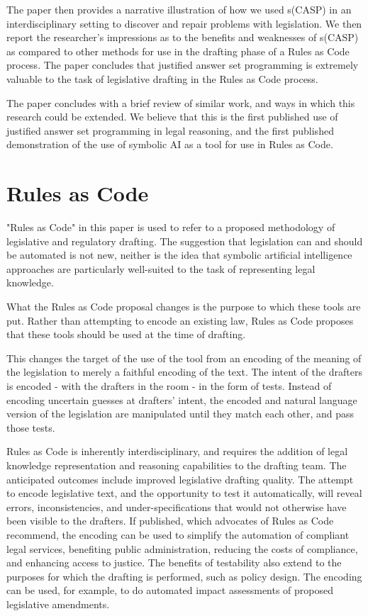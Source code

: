 \documentclass[sigconf]{acmart}
\begin{document}
The paper then provides a narrative illustration of how we used
s(CASP) in an interdisciplinary setting to discover and
repair problems with legislation. We then report the researcher's impressions
as to the benefits and weaknesses of s(CASP) as compared to other methods for use in the
drafting phase of a Rules as Code process. The paper concludes that justified
answer set programming is extremely valuable to the task of legislative drafting
in the Rules as Code process.

The paper concludes with a brief review of similar work, and ways in which this research could
be extended. We believe that this is the first published use of justified answer
set programming in legal reasoning, and the first published demonstration of the
use of symbolic AI as a tool for use in Rules as Code. 

\section{Rules as Code}

"Rules as Code" in this paper is used to refer to a proposed methodology of legislative and regulatory
drafting. The suggestion that legislation can and should be automated is not new, neither is the idea
that symbolic artificial intelligence approaches are particularly well-suited to the task of representing legal knowledge.

What the Rules as Code proposal changes is the purpose to which these tools are put.
Rather than attempting to encode an existing law, Rules as Code
proposes that these tools should be used at the time of drafting.

This changes the target of the use of the tool from an encoding of the meaning
of the legislation to merely a faithful encoding of the text. The intent of the
drafters is encoded - with the drafters in the room - in the form of tests.
Instead of encoding uncertain guesses at drafters' intent, the encoded and natural 
language version of the legislation are manipulated until they
match each other, and pass those tests.

Rules as Code is inherently interdisciplinary, and requires the addition of
legal knowledge representation and reasoning capabilities to the drafting team.
The anticipated outcomes include improved legislative drafting quality. The attempt
to encode legislative text, and the opportunity to test it automatically, will
reveal errors, inconsistencies, and under-specifications that would not otherwise
have been visible to the drafters. If published, which advocates of Rules as Code
recommend, the encoding can be used
to simplify the automation of compliant legal services, benefiting public
administration, reducing the costs of compliance, and enhancing access to justice. 
The benefits of testability also extend to the
purposes for which the drafting is performed, such as policy design. The encoding 
can be used, for example, to do automated impact assessments of proposed legislative amendments.
\end{document}
